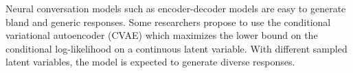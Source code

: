 Neural conversation models such as encoder-decoder models are easy to generate bland and generic responses. Some researchers propose to use the conditional variational autoencoder (CVAE) which maximizes the lower bound on the conditional log-likelihood on a continuous latent variable. With different sampled latent variables, the model is expected to generate diverse responses.